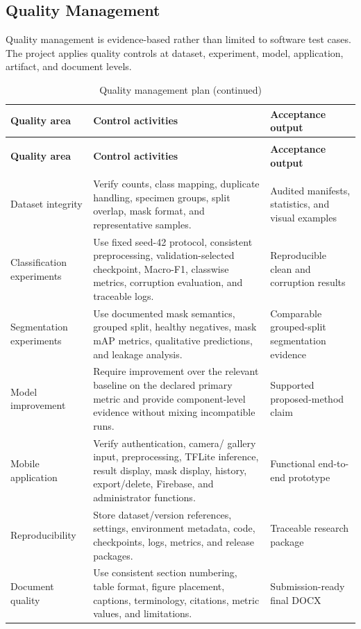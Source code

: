 \documentclass[12pt,a4paper]{report}
\begin{document}
\subsection{Quality Management}
Quality management is evidence-based rather than limited to software test cases. The project applies quality controls at dataset, experiment, model, application, artifact, and document levels.\par
\begingroup
\footnotesize
\setlength{\tabcolsep}{2pt}
\renewcommand{\arraystretch}{1.16}
\begin{longtable}{|>{\centering\arraybackslash}p{3.20cm}|>{\centering\arraybackslash}p{8.10cm}|>{\centering\arraybackslash}p{4.50cm}|}
\caption{Quality management plan}\\
\hline
\rowcolor{HeaderPeach}\textbf{Quality area} & \textbf{Control activities} & \textbf{Acceptance output} \\ \hline
\endfirsthead
\caption[]{Quality management plan (continued)}\\
\hline
\rowcolor{HeaderPeach}\textbf{Quality area} & \textbf{Control activities} & \textbf{Acceptance output} \\ \hline
\endhead
\hline
\multicolumn{3}{r}{\footnotesize Continued on next page}\\
\endfoot
\hline
\endlastfoot
\rowcolor{RevisionYellow}Dataset integrity & Verify counts, class mapping, duplicate handling, specimen groups, split overlap, mask format, and representative samples. & Audited manifests, statistics, and visual examples \\ \hline
Classification experiments & Use fixed seed-42 protocol, consistent preprocessing, validation-selected checkpoint, Macro-F1, classwise metrics, corruption evaluation, and traceable logs. & Reproducible clean and corruption results \\ \hline
\rowcolor{RevisionYellow}Segmentation experiments & Use documented mask semantics, grouped split, healthy negatives, mask mAP metrics, qualitative predictions, and leakage analysis. & Comparable grouped-split segmentation evidence \\ \hline
\rowcolor{RevisionYellow}Model improvement & Require improvement over the relevant baseline on the declared primary metric and provide component-level evidence without mixing incompatible runs. & Supported proposed-method claim \\ \hline
\rowcolor{RevisionYellow}Mobile application & Verify authentication, camera/ gallery input, preprocessing, TFLite inference, result display, mask display, history, export/delete, Firebase, and administrator functions. & Functional end-to-end prototype \\ \hline
Reproducibility & Store dataset/version references, settings, environment metadata, code, checkpoints, logs, metrics, and release packages. & Traceable research package \\ \hline
\rowcolor{RevisionYellow}Document quality & Use consistent section numbering, table format, figure placement, captions, terminology, citations, metric values, and limitations. & Submission-ready final DOCX \\ \hline
\end{longtable}
\end{document}
